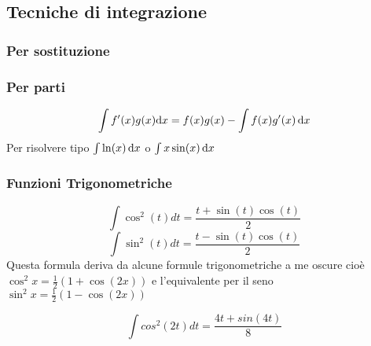 \subsection{Tecniche di integrazione}
\subsubsection{Per sostituzione}

\subsubsection{Per parti}
\begin{equation}
	\int f'(x) g(x) \mathrm{d}x = f(x)g(x) - \int f(x) g'(x)\,\mathrm{d} x
\end{equation}
Per risolvere tipo $\int \ln(x) \,\mathrm{d} x$ o $\int x \sin(x) \,\mathrm{d} x$
\subsubsection{Funzioni Trigonometriche}

\begin{equation}
	\int \cos^2(t)dt = \frac{t+\sin(t)\cos(t)}{2}
\end{equation}
\begin{equation}
	\int \sin^2(t)dt = \frac{t-\sin(t)\cos(t)}{2}
\end{equation}
Questa formula deriva da alcune formule trigonometriche a me oscure cioè $\cos^2x = \frac{1}{2} (1+\cos(2x))$ e l'equivalente per il seno $\sin^2x=\frac{1}{2}(1-\cos(2x))$

\begin{equation}
	\int cos^2(2t)dt = \frac{4t+sin(4t)}{8}
\end{equation}
